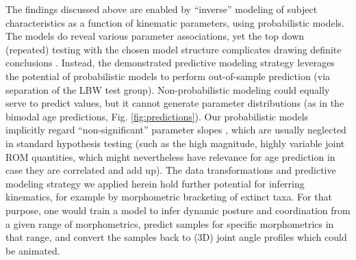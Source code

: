 The findings discussed above are enabled by ``inverse'' modeling of subject characteristics as a function of kinematic parameters, using probabilistic models.
The models do reveal various parameter associations, yet the top down (repeated) testing with the chosen model structure complicates drawing definite conclusions \citep[e.g. we observed a sex effect on size, but opposite of what other studies have reported,][we conclude males in our study were just smaller by chance]{Baxter2012}.
Instead, the demonstrated predictive modeling strategy \citep{Shmueli2010} leverages the potential of probabilistic models to perform out-of-sample prediction (via separation of the LBW test group).
Non-probabilistic modeling could equally serve to predict values, but it cannot generate parameter distributions (as in the bimodal age predictions, Fig. \ref{fig:predictions}).
Our probabilistic models implicitly regard ``non-significant'' parameter slopes , which are usually neglected in standard hypothesis testing (such as the high magnitude, highly variable joint ROM quantities, which might nevertheless have relevance for age prediction in case they are correlated and add up).
The data transformations and predictive modeling strategy we applied herein hold further potential for inferring kinematics, for example by morphometric bracketing of extinct taxa.
For that purpose, one would train a model to infer dynamic posture and coordination from a given range of morphometrics, predict samples for specific morphometrics in that range, and convert the samples back to (3D) joint angle profiles which could be animated.



